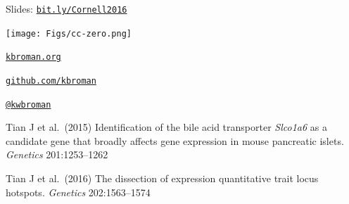 \documentclass[12pt,t]{beamer}
\begin{document}
\begin{frame}[c]{}

\Large

\vspace*{10mm}
Slides: \href{http://bit.ly/Cornell2016}{\tt bit.ly/Cornell2016}

\vspace*{-7mm}
\hspace{90mm} \texttt{[image: Figs/cc-zero.png]}

\vspace{2mm}

\href{http://kbroman.org}{\tt kbroman.org}

\vspace{2mm}

\href{https://github.com/kbroman}{\tt github.com/kbroman}

\vspace{2mm}

\href{https://twitter.com/kwbroman}{\tt @kwbroman}

\footnotesize
\vspace{12mm}

Tian J et al.\ (2015) Identification of the bile acid transporter \emph{Slco1a6\/} as a
candidate gene that broadly affects gene expression in mouse
pancreatic islets. \emph{Genetics\/} 201:1253--1262

\vspace{3mm}

Tian J et al.\ (2016) The dissection of expression quantitative trait
locus hotspots. \emph{Genetics\/} 202:1563--1574



\end{frame}
\end{document}
